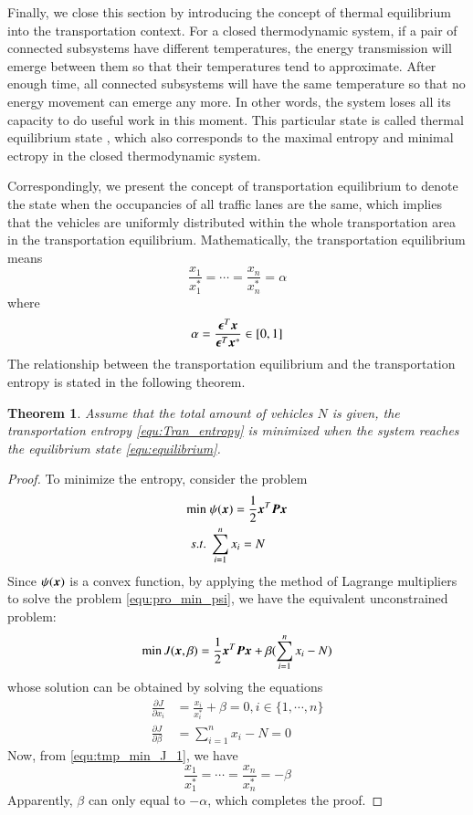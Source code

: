 \documentclass[preprint,authoryear,12pt]{elsarticle}
\renewcommand{\vec}[1]{\mbox{\boldmath$#1$}}
\newcommand{\mat}[1]{\mbox{\boldmath$#1$}}
\newtheorem{thm}{Theorem}
\begin{document}
Finally, we close this section by introducing the concept of thermal equilibrium into the transportation context. For a closed thermodynamic system, if a pair of connected subsystems have different temperatures, the energy transmission will emerge between them so that their temperatures tend to approximate. After enough time, all connected subsystems will have the same temperature so that no energy movement can emerge any more. In other words, the system loses all its capacity to do useful work in this moment. This particular state is called thermal equilibrium state \citep{cengel_thermodynamics:_2001}, which also corresponds to the maximal entropy and minimal ectropy in the closed thermodynamic system.

Correspondingly, we present the concept of transportation equilibrium to denote the state when the occupancies of all traffic lanes are the same, which implies that the vehicles are uniformly distributed within the whole transportation area in the transportation equilibrium. Mathematically, the transportation equilibrium means
\begin{equation}\label{equ:equilibrium}
\frac{x_1}{x_1^*}=\cdots=\frac{x_n}{x_n^*}=\alpha
\end{equation}
where
$$\alpha = \frac{\vec{\epsilon}^T\vec{x}}{\vec{\epsilon}^T\vec{x}^*}
\in[0,1]$$
The relationship between the transportation equilibrium and the transportation entropy is stated in the following theorem.

\begin{thm}\label{thm:entropy_equilibrium}
Assume that the total amount of vehicles $N$ is given, the transportation entropy \eqref{equ:Tran_entropy} is minimized when the system reaches the equilibrium state \eqref{equ:equilibrium}.
\end{thm}
\begin{proof}
To minimize the entropy, consider the problem
\begin{align}\label{equ:pro_min_psi}
\min\; &\psi(\vec{x}) = \frac{1}{2}\vec{x}^T\mat{P}\vec{x}\\
s.t.\; &\sum_{i=1}^n x_i = N \nonumber
\end{align}
Since $\psi(\vec{x})$ is a convex function, by applying the method of Lagrange multipliers to solve the problem \eqref{equ:pro_min_psi}, we have the equivalent unconstrained problem:
$$\min J(\vec{x},\beta) =
\frac{1}{2}\vec{x}^T\mat{P}\vec{x}+\beta(\sum_{i=1}^n x_i - N)$$
whose solution can be obtained by solving the equations
\begin{align}
\label{equ:tmp_min_J_1}
\frac{\partial J}{\partial x_i} &= \frac{x_i}{x_i^*}+\beta =0,
i\in\{1,\cdots,n\}\\
\label{equ:tmp_min_J_2}
\frac{\partial J}{\partial \beta} &= \sum_{i=1}^n x_i - N =0
\end{align}
Now, from \eqref{equ:tmp_min_J_1}, we have
$$\frac{x_1}{x_1^*}=\cdots=\frac{x_n}{x_n^*}=-\beta
$$
Apparently, $\beta$ can only equal to $-\alpha$, which completes the proof.
\end{proof}
\end{document}
